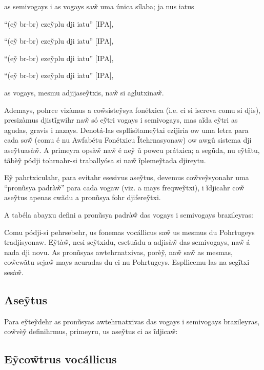 \documentclass[12pt, a5paper, titlepage]{article}
\begin{document}
\begin{bilingualpages}
    as semivogays i as vogays sa\~w uma única sílaba; ja nus iatus
    \newline
    \par ``(e\~y br-br) eze\~yplu dji iatu'' [IPA],
    \par ``(e\~y br-br) eze\~yplu dji iatu'' [IPA],
    \par ``(e\~y br-br) eze\~yplu dji iatu'' [IPA],
    \par ``(e\~y br-br) eze\~yplu dji iatu'' [IPA],
    \newline

    as vogays, mesmu adjijase\~ytxis, na\~w si aglutxina\~w.

    Ademays, pohrce vizàmus a co\~wsiste\~ysya fonétxica (i.e. ci si iscreva comu
    si djis), presizàmus djistĩgwihr na\~w só e\~ytri vogays i semivogays, mas aĩda
    e\~ytri as agudas, gravis i nazays. Denotá-las espllisitame\~ytxi ezijiria ow
    uma letra para cada so\~w (comu é nu Awfabétu Fonétxicu Ĩtehrnasyonaw) ow awgû
    sistema dji ase\~ytuasà\~w. A primeyra opsà\~w na\~w é ne\~y ũ powcu prátxica;
    a segũda, nu e\~ytãtu, tãbè\~y pódji tohrnahr-si traballyósa si na\~w
    ĩpleme\~ytada djireytu.

    E\~y pahrtxiculahr, para evitahr esesivus ase\~ytus, devemus co\~wve\~ysyonahr
    uma ``pronũsya padrà\~w'' para cada vogaw (viz. a mays freqwe\~ytxi), i
    ĩdjicahr co\~w ase\~ytus apenas cwãdu a pronũsya fohr djifere\~ytxi.

    A tabéla abayxu defini a pronũsya padrà\~w das vogays i semivogays brazileyras:

    \BrTableVowels

    Comu pódji-si pehrsebehr, us fonemas vocállicus sa\~w us mesmus du Pohrtugeys
    tradjisyonaw. E\~ytà\~w, nesi se\~ytxidu, esetuãdu a adjisà\~w das semivogays,
    na\~w á nada dji novu. As pronũsyas awtehrnatxivas, porè\~y, na\~w sa\~w as
    mesmas, co\~wcwãtu seja\~w mays acuradas du ci nu Pohrtugeys. Espllicemu-las na
    segĩtxi sesà\~w.

    \subsection{Ase\~ytus}
    Para e\~yte\~ydehr as pronũsyas awtehrnatxivas das vogays i semivogays
    brazileyras, co\~wvè\~y definihrmus, primeyru, us ase\~ytus ci as ĩdjica\~w:

    \BrTableDiacritics

    \subsection{E\~yco\~wtrus vocállicus}

\end{bilingualpages}
\end{document}
